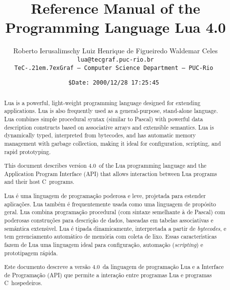 \documentclass[11pt]{article}
\def\tecgraf{{\sf TeC\kern-.21em\lower.7ex\hbox{Graf}}}
\newcommand{\Version}{4.0}
\begin{document}
\title{\Large\bf Reference Manual of the Programming Language Lua \Version}

\author{%
Roberto Ierusalimschy\quad
Luiz Henrique de Figueiredo\quad
Waldemar Celes
\vspace{1.0ex}\\
\smallskip
\small\tt lua@tecgraf.puc-rio.br
\vspace{2.0ex}\\
\tecgraf\ --- Computer Science Department --- PUC-Rio
}

\date{{\small \tt\$Date: 2000/12/28 17:25:45 $ $}}

\maketitle

\pagestyle{plain}

\begin{abstract}
\noindent
Lua is a powerful, light-weight programming language
designed for extending applications.
Lua is also frequently used as a general-purpose, stand-alone language.
Lua combines simple procedural syntax
(similar to Pascal)
with
powerful data description constructs
based on associative arrays and extensible semantics.
Lua is
dynamically typed,
interpreted from bytecodes,
and has automatic memory management with garbage collection,
making it ideal for
configuration,
scripting,
and
rapid prototyping.

This document describes version \Version\ of the Lua programming language
and the Application Program Interface (API)
that allows interaction between Lua programs and their host C~programs.
\end{abstract}

\def\abstractname{Resumo}
\begin{abstract}
\noindent
Lua \'e uma linguagem de programa\c{c}\~ao
poderosa e leve,
projetada para estender aplica\c{c}\~oes.
Lua tamb\'em \'e frequentemente usada como uma linguagem de prop\'osito geral.
Lua combina programa\c{c}\~ao procedural
(com sintaxe semelhante \`a de Pascal)
com
poderosas constru\c{c}\~oes para descri\c{c}\~ao de dados,
baseadas em tabelas associativas e sem\^antica extens\'\i vel.
Lua \'e
tipada dinamicamente,
interpretada a partir de \emph{bytecodes},
e tem gerenciamento autom\'atico de mem\'oria com coleta de lixo.
Essas caracter\'{\i}sticas fazem de Lua uma linguagem ideal para
configura\c{c}\~ao,
automa\c{c}\~ao (\emph{scripting})
e prototipagem r\'apida.

Este documento descreve a vers\~ao \Version\ da linguagem de
programa\c{c}\~ao Lua e a Interface de Programa\c{c}\~ao (API) que permite
a intera\c{c}\~ao entre programas Lua e programas C~hospedeiros.
\end{abstract}
\end{document}
